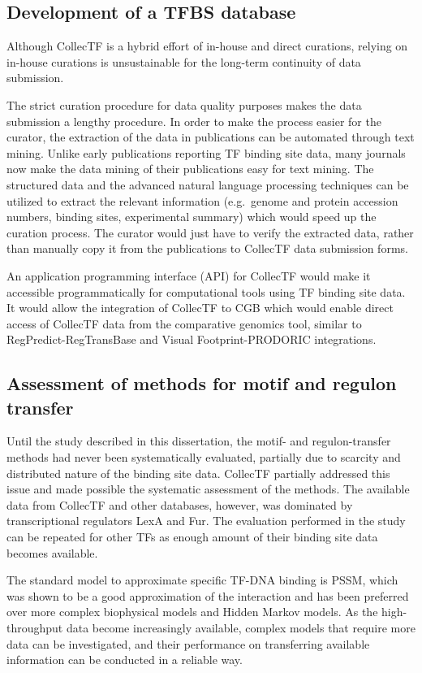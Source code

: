 \subsection{Development of a TFBS database}

Although CollecTF is a hybrid effort of in-house and direct curations, relying
on in-house curations is unsustainable for the long-term continuity of data
submission.

The strict curation procedure for data quality purposes makes the data
submission a lengthy procedure. In order to make the process easier for the
curator, the extraction of the data in publications can be automated through
text mining. Unlike early publications reporting TF binding site data, many
journals now make the data mining of their publications easy for text
mining. The structured data and the advanced natural language processing
techniques can be utilized to extract the relevant information (e.g.\ genome
and protein accession numbers, binding sites, experimental summary) which would
speed up the curation process. The curator would just have to verify the
extracted data, rather than manually copy it from the publications to CollecTF
data submission forms.

An application programming interface (API) for CollecTF would make it
accessible programmatically for computational tools using TF binding site
data. It would allow the integration of CollecTF to CGB which would enable
direct access of CollecTF data from the comparative genomics tool, similar to
RegPredict-RegTransBase and Visual Footprint-PRODORIC integrations.

\subsection{Assessment of methods for motif and regulon transfer}

Until the study described in this dissertation, the motif- and regulon-transfer
methods had never been systematically evaluated, partially due to scarcity and
distributed nature of the binding site data. CollecTF partially addressed this
issue and made possible the systematic assessment of the methods. The available
data from CollecTF and other databases, however, was dominated by
transcriptional regulators LexA and Fur. The evaluation performed in the study
can be repeated for other TFs as enough amount of their binding site data
becomes available.

The standard model to approximate specific TF-DNA binding is PSSM, which was
shown to be a good approximation of the interaction and has been preferred over
more complex biophysical models and Hidden Markov models. As the
high-throughput data become increasingly available, complex models that require
more data can be investigated, and their performance on transferring available
information can be conducted in a reliable way.

